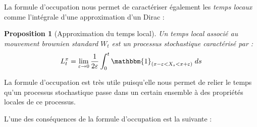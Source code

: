 \documentclass[openany]{book}
\newcommand{\1}{\mathbbm{1}}
\theoremstyle{thmfont}
\theoremstyle{deffont}
\theoremstyle{thmfont}
\newtheorem{prop}[prop]{Proposition}
\theoremstyle{deffont}
\newtheorem*{remark}{Remarque}
\begin{document}
La formule d'occupation nous permet de caractériser également les \textit{temps locaux} comme l'intégrale d'une approximation d'un Dirac :

\begin{prop}[Approximation du temps local]
  \label{prop:caractTempsLoc}
  Un \textit{temps local} associé au mouvement brownien standard $W_t$ est un processus stochastique caractérisé par :
\begin{equation*}
  L_t^x = \lim_{\varepsilon \to 0} \frac{1}{2\varepsilon} \int_0^t \1_{(x - \varepsilon < X_s < x + \varepsilon)} \; ds
\end{equation*}
\end{prop}


La formule d'occupation est très utile puisqu'elle nous permet de relier le temps qu’un processus stochastique passe dans un certain ensemble à des propriétés locales de ce processus.

L'une des conséquences de la formule d'occupation est la suivante :
\end{document}
